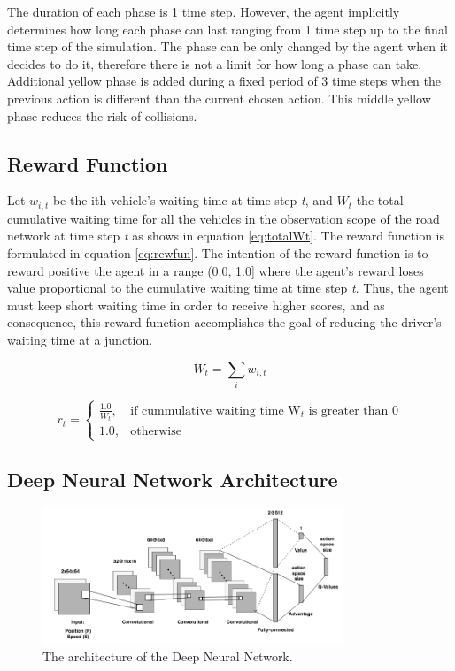 \documentclass{llncs}
\begin{document}
The duration of each phase is 1 time step. However, the agent implicitly determines how long each phase can last ranging from 1 time step up to the final time step of the simulation. The phase can be only changed by the agent when it decides to do it, therefore there is not a limit for how long a phase can take. Additional yellow phase is added during a fixed period of 3 time steps when the previous action is different than the current chosen action. This middle yellow phase reduces the risk of collisions.

\subsection{Reward Function}

Let $w_{i,t}$ be the ith vehicle's waiting time at time step \textit{t}, and $W_{t}$ the total cumulative waiting time for all the vehicles in the observation scope of the road network at time step \textit{t} as shows in equation \ref{eq:totalWt}. The reward function is formulated in equation \ref{eq:rewfun}. The intention of the reward function is to reward positive the agent in a range (0.0, 1.0] where the agent's reward loses value proportional to the cumulative waiting time at time step \textit{t}. Thus, the agent must keep short waiting time in order to receive higher scores, and as consequence, this reward function accomplishes the goal of reducing the driver's waiting time at a junction.

\begin{equation} \label{eq:totalWt}
W_{t} = \sum_{i}w_{i,t}
\end{equation}

\begin{equation} \label{eq:rewfun}
r_{t} = \begin{cases}
    \frac{1.0}{W_{t}}, & \text{if cummulative waiting time W$_{t}$ is greater than 0}\\
    1.0, & \text{otherwise}
\end{cases}
\end{equation}

\subsection{Deep Neural Network Architecture}\label{DNNArch}

\begin{figure}[!htbp]
\begin{center}
  \includegraphics[width=0.8\textwidth]{images/CNN.png}
  \caption{The architecture of the Deep Neural Network.}
  \label{fig:CNN}
\end{center}
\end{figure}
\end{document}
